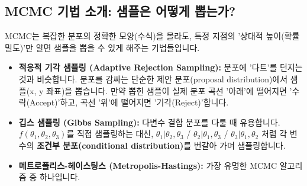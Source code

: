 \documentclass[11pt,a4paper]{book}
\theoremstyle{definition}
\begin{document}
\subsection{MCMC 기법 소개: 샘플은 어떻게 뽑는가?}
MCMC는 복잡한 분포의 정확한 모양(수식)을 몰라도, 특정 지점의 '상대적 높이(확률 밀도)'만 알면 샘플을 뽑을 수 있게 해주는 기법들입니다.

\begin{itemize}
    \item \textbf{적응적 기각 샘플링 (Adaptive Rejection Sampling):}
        분포에 '다트'를 던지는 것과 비슷합니다. 분포를 감싸는 단순한 제안 분포(proposal distribution)에서 샘플(x, y 좌표)을 뽑습니다. 만약 뽑힌 샘플이 실제 분포 곡선 '아래'에 떨어지면 '수락(Accept)'하고, 곡선 '위'에 떨어지면 '기각(Reject)'합니다.
    \item \textbf{깁스 샘플링 (Gibbs Sampling):}
        다변수 결합 분포를 다룰 때 유용합니다. $f(\theta_1, \theta_2, \theta_3)$를 직접 샘플링하는 대신, $\theta_1 | \theta_2, \theta_3$ / $\theta_2 | \theta_1, \theta_3$ / $\theta_3 | \theta_1, \theta_2$ 처럼 각 변수의 \textbf{조건부 분포(conditional distribution)}를 번갈아 가며 샘플링합니다.
    \item \textbf{메트로폴리스-헤이스팅스 (Metropolis-Hastings):}
        가장 유명한 MCMC 알고리즘 중 하나입니다.
\end{itemize}
\end{document}
